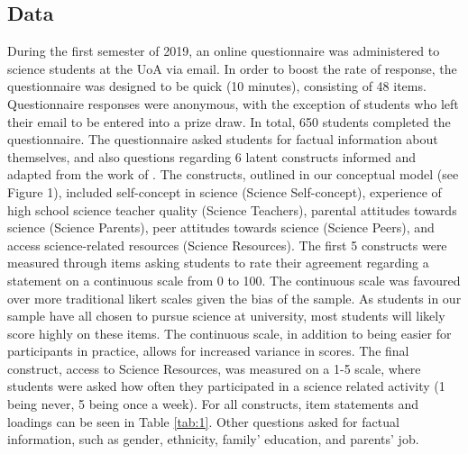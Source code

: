 \subsection*{Data}
\label{data}
During the first semester of 2019, an online questionnaire was administered to science students at the UoA via email. In order to boost the rate of response, the questionnaire was designed to be quick (10 minutes), consisting of 48 items. Questionnaire responses were anonymous, with the exception of students who left their email to be entered into a prize draw. In total, 650 students completed the questionnaire. The questionnaire asked students for factual information about themselves, and also questions regarding 6 latent constructs informed and adapted from the work of \cite{dewitt2011high}. The constructs, outlined in our conceptual model (see Figure 1), included self-concept in science (Science Self-concept), experience of high school science teacher quality (Science Teachers), parental attitudes towards science (Science Parents), peer attitudes towards science (Science Peers), and access science-related resources (Science Resources). The first 5 constructs were measured through items asking students to rate their agreement regarding a statement on a continuous scale from 0 to 100. The continuous scale was favoured over more traditional likert scales given the bias of the sample. As students in our sample have all chosen to pursue science at university, most students will likely score highly on these items. The continuous scale, in addition to being easier for participants in practice, allows for increased variance in scores. The final construct, access to Science Resources, was measured on a 1-5 scale, where students were asked how often they participated in a science related activity (1 being never, 5 being once a week). For all constructs, item statements and loadings can be seen in Table \ref{tab:1}. Other questions asked for factual information, such as gender, ethnicity, family’ education, and parents' job. 

